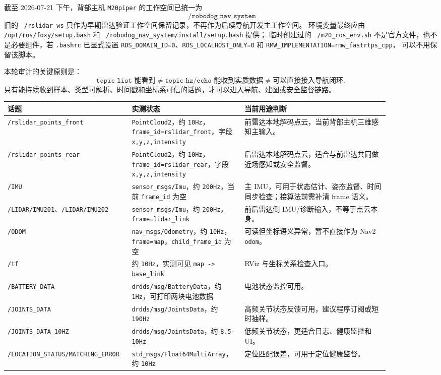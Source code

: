 \documentclass[UTF8,11pt,a4paper]{ctexart}
\begin{document}
截至 2026-07-21 下午，背部主机 \texttt{M20piper} 的工作空间已统一为
\[
\boxed{\texttt{~/robodog\_nav\_system}}
\]
旧的 \texttt{~/rslidar\_ws} 只作为早期雷达验证工作空间保留记录，不再作为后续导航开发主工作空间。
环境变量最终应由 \texttt{/opt/ros/foxy/setup.bash} 和 \texttt{~/robodog\_nav\_system/install/setup.bash} 提供；
临时创建过的 \texttt{~/m20\_ros\_env.sh} 不是官方文件，也不是必要组件，若 \texttt{.bashrc} 已显式设置
\texttt{ROS\_DOMAIN\_ID=0}、\texttt{ROS\_LOCALHOST\_ONLY=0} 和 \texttt{RMW\_IMPLEMENTATION=rmw\_fastrtps\_cpp}，
可以不用保留该脚本。

本轮审计的关键原则是：
\[
\texttt{topic list 能看到}
\neq
\texttt{topic hz/echo 能收到实质数据}
\neq
\texttt{可以直接接入导航闭环}.
\]
只有能持续收到样本、类型可解析、时间戳和坐标系可信的话题，才可以进入导航、建图或安全监督链路。

\begin{center}
\renewcommand{\arraystretch}{1.18}
\begin{tabular}{p{0.27\linewidth}p{0.25\linewidth}p{0.36\linewidth}}
\toprule
\textbf{话题} & \textbf{实测状态} & \textbf{当前用途判断}\\
\midrule
\texttt{/rslidar\_points\_front} &
\texttt{PointCloud2}，约 \texttt{10Hz}，\texttt{frame\_id=rslidar\_front}，字段 \texttt{x,y,z,intensity} &
前雷达本地解码点云，当前背部主机三维感知主输入。\\
\texttt{/rslidar\_points\_rear} &
\texttt{PointCloud2}，约 \texttt{10Hz}，\texttt{frame\_id=rslidar\_rear}，字段 \texttt{x,y,z,intensity} &
后雷达本地解码点云，适合与前雷达共同做近场感知或安全监督。\\
\texttt{/IMU} &
\texttt{sensor\_msgs/Imu}，约 \texttt{200Hz}，当前 \texttt{frame\_id} 为空 &
主 IMU，可用于状态估计、姿态监督、时间同步检查；接算法前需补清 frame 语义。\\
\texttt{/LIDAR/IMU201}、\texttt{/LIDAR/IMU202} &
\texttt{sensor\_msgs/Imu}，约 \texttt{200Hz}，\texttt{frame=lidar\_link} &
前后雷达侧 IMU/诊断输入，不等于点云本身。\\
\texttt{/ODOM} &
\texttt{nav\_msgs/Odometry}，约 \texttt{10Hz}，\texttt{frame=map}，\texttt{child\_frame\_id} 为空 &
可读但坐标语义异常，暂不直接作为 Nav2 \texttt{odom}。\\
\texttt{/tf} &
约 \texttt{10Hz}，实测可见 \texttt{map -> base\_link} &
RViz 与坐标关系检查入口。\\
\texttt{/BATTERY\_DATA} &
\texttt{drdds/msg/BatteryData}，约 \texttt{1Hz}，可打印两块电池数据 &
电池状态监控可用。\\
\texttt{/JOINTS\_DATA} &
\texttt{drdds/msg/JointsData}，约 \texttt{190Hz} &
高频关节状态反馈可用，建议程序订阅或短时抽样。\\
\texttt{/JOINTS\_DATA\_10HZ} &
\texttt{drdds/msg/JointsData}，约 \texttt{8.5-10Hz} &
低频关节状态，更适合日志、健康监控和 UI。\\
\texttt{/LOCATION\_STATUS/MATCHING\_ERROR} &
\texttt{std\_msgs/Float64MultiArray}，约 \texttt{10Hz} &
定位匹配误差，可用于定位健康监督。\\
\bottomrule
\end{tabular}
\end{center}
\end{document}
